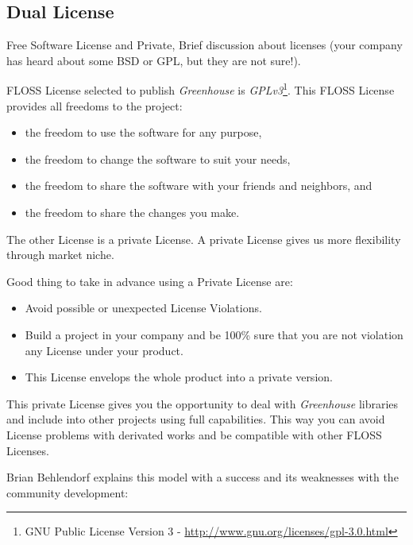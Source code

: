 \documentclass[11pt]{scrartcl}
\begin{document}
\subsection{Dual License}
\label{sub:dual-license}

\par Free Software License and Private, Brief discussion about licenses (your company has heard about some BSD or GPL, but they are not sure!).

\par FLOSS License selected to publish \emph{Greenhouse} is \emph{GPLv3}\footnote{GNU Public License Version 3 - \url{http://www.gnu.org/licenses/gpl-3.0.html}}. This FLOSS License provides all freedoms to the project:

\begin{itemize}
	\item the freedom to use the software for any purpose,
	\item the freedom to change the software to suit your needs,
	\item the freedom to share the software with your friends and neighbors, and
	\item the freedom to share the changes you make.
\end{itemize}

\par The other License is a private License. A private License gives us more flexibility through market niche.

\par Good thing to take in advance using a Private License are:

\begin{itemize}
	\item Avoid possible or unexpected License Violations.
	\item Build a project in your company and be 100\% sure that you are not violation any License under your product.
	\item This License envelops the whole product into a private version.
\end{itemize}

\par This private License gives you the opportunity to deal with \emph{Greenhouse} libraries and include into other projects using full capabilities. This way you can avoid License problems with derivated works and be compatible with other FLOSS Licenses.

\par Brian Behlendorf\cite{brian-behlendorf-business-strategy} explains this model with a success and its weaknesses with the community development:
\end{document}
